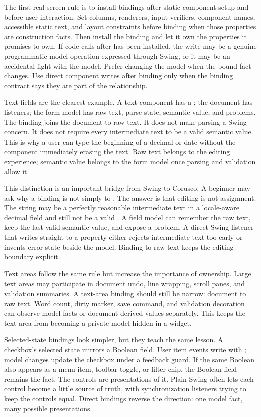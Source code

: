 The first real-screen rule is to install bindings after static component setup
and before user interaction. Set columns, renderers, input verifiers, component
names, accessible static text, and layout constraints before binding when those
properties are construction facts. Then install the binding and let it own the
properties it promises to own. If code calls  after
 has been installed, the write may be a genuine
programmatic model operation expressed through Swing, or it may be an accidental
fight with the model. Prefer changing the model when the bound fact changes.
Use direct component writes after binding only when the binding contract says
they are part of the relationship.

Text fields are the clearest example. A text component has a ;
the document has listeners; the form model has raw text, parse state, semantic
value, and problems. The binding joins the document to raw text. It does not
make parsing a Swing concern. It does not require every intermediate text to be
a valid semantic value. This is why a user can type the beginning of a decimal
or date without the component immediately erasing the text. Raw text belongs to
the editing experience; semantic value belongs to the form model once parsing
and validation allow it.

This distinction is an important bridge from Swing to Corusco. A beginner may
ask why a binding is not simply  to . The answer
is that editing is not assignment. The string  may be a perfectly
reasonable intermediate text in a locale-aware decimal field and still not be a
valid . A field model can remember the raw text, keep the last
valid semantic value, and expose a problem. A direct Swing listener that writes
straight to a  property either rejects intermediate text too
early or invents error state beside the model. Binding to raw text keeps the
editing boundary explicit.

Text areas follow the same rule but increase the importance of ownership.
Large text areas may participate in document undo, line wrapping, scroll panes,
and validation summaries. A text-area binding should still be narrow: document
to raw text. Word count, dirty marker, save command, and validation decoration
can observe model facts or document-derived values separately. This keeps the
text area from becoming a private model hidden in a widget.

Selected-state bindings look simpler, but they teach the same lesson. A
checkbox's selected state mirrors a Boolean field. User item events write with
; model changes update the checkbox under a feedback
guard. If the same Boolean also appears as a menu item, toolbar toggle, or
filter chip, the Boolean field remains the fact. The controls are presentations
of it. Plain Swing often lets each control become a little source of truth,
with synchronization listeners trying to keep the controls equal. Direct
bindings reverse the direction: one model fact, many possible presentations.

